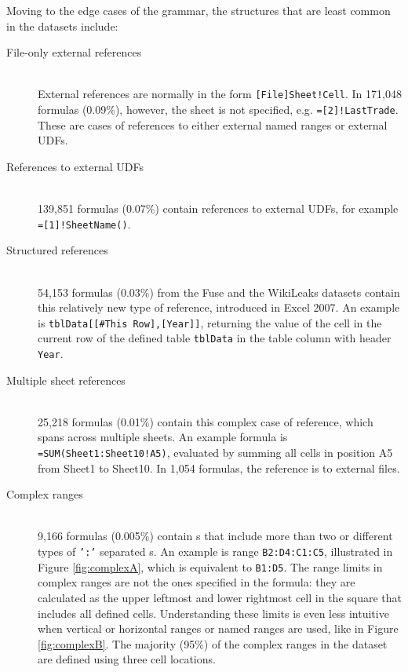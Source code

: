 \documentclass[times]{smrauth}
\begin{document}
Moving to the edge cases of the grammar, the structures that are least common in the datasets include:
\begin{description}
	\item[File-only external references] \hfill \\
	External references are normally in the form \texttt{[File]Sheet!Cell}. In 171,048 formulas (0.09\%), however, the sheet is not specified, e.g. \texttt{=[2]!LastTrade}. These are cases of references to either external named ranges or external UDFs.
	\item[References to external UDFs] \hfill \\
	139,851 formulas (0.07\%) contain references to external UDFs, for example \texttt{=[1]!SheetName()}.
	\item[Structured references] \hfill \\
	54,153 formulas (0.03\%) from the Fuse and the WikiLeaks datasets contain this relatively new type of reference, introduced in Excel 2007. An example is \texttt{tblData[[\#This Row],[Year]]}, returning the value of the cell in the current row of the defined table \texttt{tblData} in the table column with header \texttt{Year}.
	\item[Multiple sheet references] \hfill \\
	25,218 formulas (0.01\%) contain this complex case of reference, which spans across multiple sheets. An example formula is \texttt{=SUM(Sheet1:Sheet10!A5)}, evaluated by summing all cells in position A5 from Sheet1 to Sheet10. In 1,054 formulas, the reference is to external files.
	\item[Complex ranges]  \hfill \\
	9,166 formulas (0.005\%) contain s that include more than two or different types of \texttt{':'} separated s. An example is range \texttt{B2:D4:C1:C5}, illustrated in Figure \ref{fig:complexA}, which is equivalent to \texttt{B1:D5}. The range limits in complex ranges are not the ones specified in the formula: they are calculated as the upper leftmost and lower rightmost cell in the square that includes all defined cells. Understanding these limits is even less intuitive when vertical or horizontal ranges or named ranges are used, like in Figure \ref{fig:complexB}. The majority (95\%) of the complex ranges in the dataset are defined using three cell locations.
	\begin{figure}
		\centering
		\begin{subfigure}[b]{0.49\textwidth}
			\centering

\end{subfigure}
\end{figure}
\end{description}
\end{document}
